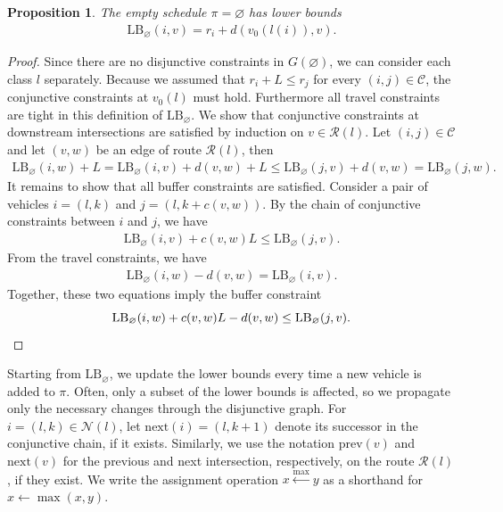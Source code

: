 \documentclass[a4paper]{article}
\theoremstyle{definition}
\theoremstyle{plain}
\newtheorem{proposition}{Proposition}
\begin{document}
\begin{proposition}
  The empty schedule $\pi = \varnothing$ has lower bounds
  \begin{align}
    \mathrm{LB}_{\varnothing}(i, v) = r_{i} + d(v_{0}(l(i)), v) .
  \end{align}
\end{proposition}
\begin{proof}
  Since there are no disjunctive constraints in $G(\varnothing)$, we can
  consider each class $l$ separately.
  Because we assumed that $r_{i} + L \leq r_{j}$ for every
  $(i, j) \in \mathcal{C}$, the conjunctive constraints at $v_{0}(l)$ must hold.
  Furthermore all travel constraints are tight in this definition of
  $\mathrm{LB}_{\varnothing}$.
  We show that conjunctive constraints at downstream intersections are satisfied
  by induction on $v \in \mathcal{R}(l)$. Let $(i, j) \in \mathcal{C}$ and let
  $(v, w)$ be an edge of route $\mathcal{R}(l)$, then
  \begin{align*} \mathrm{LB}_{\varnothing}(i, w) + L = \mathrm{LB}_{\varnothing}(i, v) + d(v, w) + L \leq \mathrm{LB}_{\varnothing}(j, v) + d(v, w) = \mathrm{LB}_{\varnothing}(j, w) .
  \end{align*}
  It remains to show that all buffer constraints are satisfied. Consider a pair
  of vehicles $i = (l, k)$ and $j = (l, k + c(v,w))$. By the chain of
  conjunctive constraints between $i$ and $j$, we have
  \begin{align*}
    \mathrm{LB}_{\varnothing}(i, v) + c(v, w) L \leq \mathrm{LB}_{\varnothing}(j, v) .
  \end{align*}
  From the travel constraints, we have
  \begin{align*}
    \mathrm{LB}_{\varnothing}(i, w) - d(v,w) = \mathrm{LB}_{\varnothing}(i, v) .
  \end{align*}
  Together, these two equations imply the buffer constraint
  \begin{equation*}
    \mathrm{LB}_{\varnothing}(i, w) + c(v, w) L - d(v, w) \leq
    \mathrm{LB}_{\varnothing}(j, v) . \qedhere
  \end{equation*}
\end{proof}

Starting from $\mathrm{LB}_{\varnothing}$, we update the lower bounds every time
a new vehicle is added to $\pi$. Often, only a subset of the lower bounds is
affected, so we propagate only the necessary changes through the disjunctive
graph. For $i = (l, k) \in \mathcal{N}(l)$, let $\mathrm{next}(i) = (l, k + 1)$
denote its successor in the conjunctive chain, if it exists. Similarly, we use
the notation $\mathrm{prev}(v)$ and $\mathrm{next}(v)$ for the previous and next
intersection, respectively, on the route $\mathcal{R}(l)$, if they exist. We
write the assignment operation $x \xleftarrow{\max} y$ as a shorthand for
$x \gets \max(x, y)$.
\end{document}

